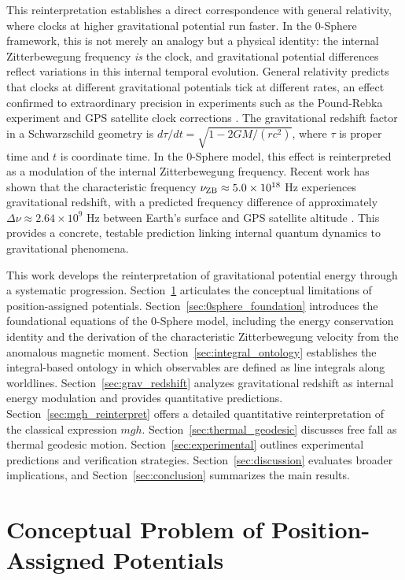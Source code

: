 \documentclass[%
 reprint,
 amsmath,amssymb,
 aps,
 prb,
]{revtex4-2}
\numberwithin{equation}{section}
\begin{document}
This reinterpretation establishes a direct correspondence with general relativity, where clocks at higher gravitational potential run faster. In the 0-Sphere framework, this is not merely an analogy but a physical identity: the internal Zitterbewegung frequency \emph{is} the clock, and gravitational potential differences reflect variations in this internal temporal evolution. General relativity predicts that clocks at different gravitational potentials tick at different rates, an effect confirmed to extraordinary precision in experiments such as the Pound-Rebka experiment \cite{Pound1960} and GPS satellite clock corrections \cite{Ashby2003}. The gravitational redshift factor in a Schwarzschild geometry is $d\tau/dt = \sqrt{1 - 2GM/(rc^2)}$, where $\tau$ is proper time and $t$ is coordinate time. In the 0-Sphere model, this effect is reinterpreted as a modulation of the internal Zitterbewegung frequency. Recent work has shown that the characteristic frequency $\nu_{\rm ZB} \approx 5.0 \times 10^{18}$ Hz experiences gravitational redshift, with a predicted frequency difference of approximately $\Delta \nu \approx 2.64 \times 10^9$ Hz between Earth's surface and GPS satellite altitude \cite{Hanamura2025GravRedshift}. This provides a concrete, testable prediction linking internal quantum dynamics to gravitational phenomena.

This work develops the reinterpretation of gravitational potential energy through a systematic progression. Section~\ref{sec:conceptual_problem} articulates the conceptual limitations of position-assigned potentials. Section~\ref{sec:0sphere_foundation} introduces the foundational equations of the 0-Sphere model, including the energy conservation identity and the derivation of the characteristic Zitterbewegung velocity from the anomalous magnetic moment. Section~\ref{sec:integral_ontology} establishes the integral-based ontology in which observables are defined as line integrals along worldlines. Section~\ref{sec:grav_redshift} analyzes gravitational redshift as internal energy modulation and provides quantitative predictions. Section~\ref{sec:mgh_reinterpret} offers a detailed quantitative reinterpretation of the classical expression $mgh$. Section~\ref{sec:thermal_geodesic} discusses free fall as thermal geodesic motion. Section~\ref{sec:experimental} outlines experimental predictions and verification strategies. Section~\ref{sec:discussion} evaluates broader implications, and Section~\ref{sec:conclusion} summarizes the main results.

\section{Conceptual Problem of Position-Assigned Potentials}
\label{sec:conceptual_problem}
\end{document}
